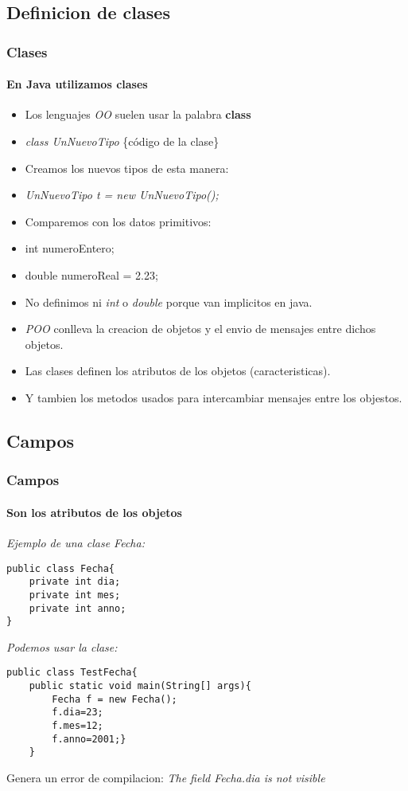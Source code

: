 \documentclass{beamer}
\begin{document}
\subsection{Definicion de clases}
\begin{frame}
    \frametitle{Clases}
    \framesubtitle{En Java utilizamos clases}

\begin{itemize}[<+-| alert@+>]

      \item Los lenguajes \emph{OO} suelen usar la palabra \bf{class}
      \item \emph{class UnNuevoTipo} \{código de la clase\}
      \item Creamos los nuevos tipos de esta manera:
      \item \emph{UnNuevoTipo t = new UnNuevoTipo();}
      \item Comparemos con los datos primitivos:
      \item int numeroEntero;
      \item double numeroReal = 2.23;
      \item No definimos ni \emph{int} o \emph{double} porque van implicitos en java.
      \item \emph{POO} conlleva la creacion de objetos y el envio de mensajes entre dichos objetos.
      \item Las clases definen los atributos de los objetos (caracteristicas).
      \item Y tambien los metodos usados para intercambiar mensajes entre los objestos.
\end{itemize}
\pause
\end{frame}

\subsection{Campos}


\begin{frame}[fragile]
    \frametitle{Campos}
    \framesubtitle{Son los atributos de los objetos}
\pause
\emph{Ejemplo de una clase Fecha:}\\
\begin{verbatim}
public class Fecha{
    private int dia;
    private int mes;
    private int anno;
}
\end{verbatim}   
\pause
\emph{Podemos usar la clase:} \\
\begin{verbatim}
public class TestFecha{
    public static void main(String[] args){
        Fecha f = new Fecha();
        f.dia=23;
        f.mes=12;
        f.anno=2001;}
    }
\end{verbatim}
\pause
Genera un error de compilacion: \emph{The field Fecha.dia is not visible} 
\end{frame}
\end{document}
